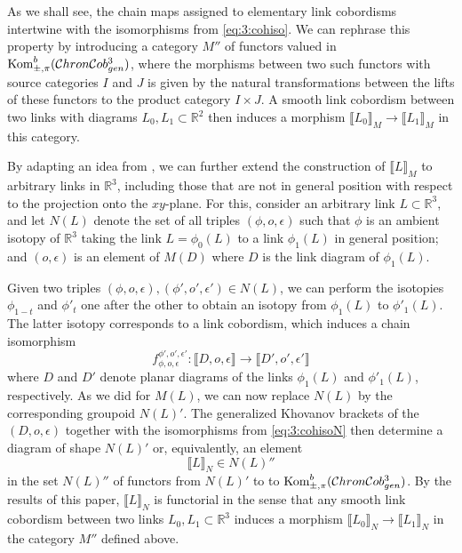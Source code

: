 \documentclass[12pt]{amsart}
\theoremstyle{definition}
\theoremstyle{plain}
\newcommand{\kombpmp}[1]{\textnormal{Kom}^b_{\pm,\pi}(#1)}
\begin{document}
As we shall see, the chain maps assigned to elementary link cobordisms
intertwine with the isomorphisms from \eqref{eq:3:cohiso}.
We can rephrase this property by introducing a category
$M''$ of functors valued in $\kombpmp{\mathcal{C}hron\mathcal{C}ob^3_{gen}}$,
where the morphisms between two such functors with source categories $I$ and $J$
is given by the natural transformations between the lifts of these functors
to the product category $I\times J$. A smooth link cobordism between two links with 
diagrams
$L_0,L_1\subset\mathbb{R}^2$ then induces a morphism $\llbracket L_0\rrbracket_M\rightarrow\llbracket L_1\rrbracket_M$
in this category.

By adapting an idea from \cite{BHL2019}, we can further extend the construction of $\llbracket L\rrbracket_M$
to arbitrary links in $\mathbb{R}^3$, including those that are not in general position
with respect to the projection onto the $xy$-plane. For this, consider an arbitrary link $L\subset\mathbb{R}^3$,
and let $N(L)$ denote the set of all triples $(\phi,o,\epsilon)$ such that
$\phi$ is an ambient isotopy of $\mathbb{R}^3$ taking the link $L=\phi_0(L)$ to a link
$\phi_1(L)$ in general position; and $(o,\epsilon)$ is an element of $M(D)$ where $D$ is the link diagram
of $\phi_1(L)$.

Given two triples $(\phi,o,\epsilon),(\phi',o',\epsilon')\in N(L)$, we can perform the isotopies $\phi_{1-t}$
and $\phi'_t$ one after the other to obtain an isotopy from $\phi_1(L)$ to $\phi'_1(L)$.
The latter isotopy corresponds to a link cobordism, which
induces a chain isomorphism
\begin{equation}\label{eq:3:cohisoN}
f_{\phi,o,\epsilon}^{\phi',o',\epsilon'}\colon\llbracket D,o,\epsilon\rrbracket\longrightarrow\llbracket D',o',\epsilon'\rrbracket
\end{equation}
where $D$ and $D'$ denote planar diagrams of the links $\phi_1(L)$ and $\phi'_1(L)$, respectively.
As we did for $M(L)$, we can now replace $N(L)$ by the corresponding groupoid $N(L)'$.
The generalized Khovanov brackets of the $(D,o,\epsilon)$ together with the isomorphisms
from \eqref{eq:3:cohisoN} then determine a diagram of shape $N(L)'$ or, equivalently, an element
\[
\llbracket L\rrbracket_N\in N(L)''
\]
in the set $N(L)''$ of functors from $N(L)'$ to
to $\kombpmp{\mathcal{C}hron\mathcal{C}ob^3_{gen}}$.
By the results of this paper, $\llbracket L\rrbracket_N$ is functorial
in the sense that any smooth link cobordism between two links $L_0,L_1\subset\mathbb{R}^3$ induces a morphism $\llbracket L_0\rrbracket_N\rightarrow\llbracket L_1\rrbracket_N$ in the category $M''$ defined above.
\end{document}
